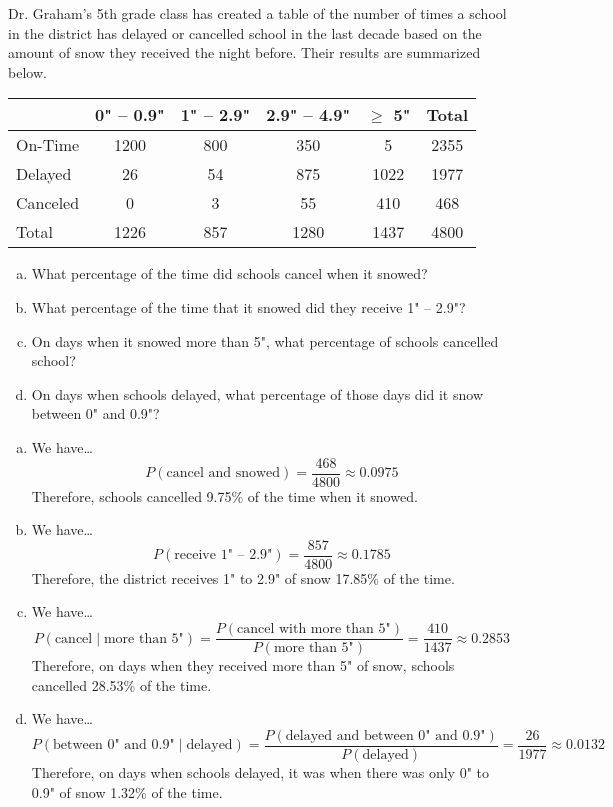 \documentclass[11pt,letterpaper]{article}
\begin{document}
 Dr. Graham's 5th grade class has created a table of the number of times a school in the district has delayed or cancelled school in the last decade based on the amount of snow they received the night before. Their results are summarized below.
	\begin{table}[!ht]
	\centering
	\begin{tabular}{|l||c|c|c|c||c|} \hline
	& 0" -- 0.9" & 1" -- 2.9" & 2.9" -- 4.9" & $\geq$ 5" & Total \\ \hline \hline
	On-Time & 1200 & 800 & 350 & 5  & 2355 \\ \hline
	Delayed & 26 & 54 & 875 & 1022 & 1977 \\ \hline
	Canceled & 0 & 3 & 55 & 410 & 468 \\ \hline \hline
	Total & 1226 & 857 & 1280 & 1437 & 4800 \\ \hline
	\end{tabular}
	\end{table}

\begin{enumerate}[(a)]
\item What percentage of the time did schools cancel when it snowed?
\item What percentage of the time that it snowed did they receive 1" -- 2.9"?
\item On days when it snowed more than 5", what percentage of schools cancelled school?
\item On days when schools delayed, what percentage of those days did it snow between 0" and 0.9"?
\end{enumerate} \pspace

\sol 
\begin{enumerate}[(a)]
\item We have\dots
	\[
	P(\text{cancel and snowed})= \dfrac{468}{4800} \approx 0.0975
	\]
Therefore, schools cancelled 9.75\% of the time when it snowed. \pspace

\item We have\dots
	\[
	P(\text{receive 1" -- 2.9"})= \dfrac{857}{4800} \approx 0.1785
	\]
Therefore, the district receives 1" to 2.9" of snow 17.85\% of the time. \pspace

\item We have\dots
	\[
	P(\text{cancel} \;|\; \text{more than 5"})= \dfrac{P(\text{cancel with more than 5"})}{P(\text{more than 5"})}= \dfrac{410}{1437} \approx 0.2853
	\]
Therefore, on days when they received more than 5" of snow, schools cancelled 28.53\% of the time. \pspace

\item We have\dots
	\[
	P(\text{between 0" and 0.9"} \;|\; \text{delayed})= \dfrac{P(\text{delayed and between 0" and 0.9"})}{P(\text{delayed})}= \dfrac{26}{1977} \approx 0.0132
	\]
Therefore, on days when schools delayed, it was when there was only 0" to 0.9" of snow 1.32\% of the time. 
\end{enumerate}
\end{document}
